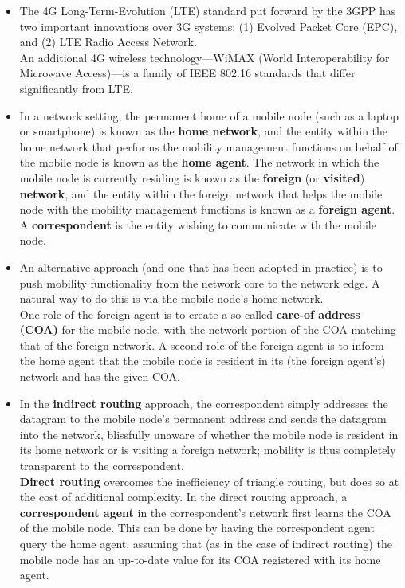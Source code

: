 \begin{itemize}
\item
The 4G Long-Term-Evolution (LTE) standard put forward by the 3GPP has two important innovations over 3G systems: (1) Evolved Packet Core (EPC), and (2) LTE Radio Access Network.\\
An additional 4G wireless technology---WiMAX (World Interoperability for Microwave Access)---is a family of IEEE 802.16 standards that differ significantly from LTE.

\item
In a network setting, the permanent home of a mobile node (such as a laptop or smartphone) is known as the \textbf{home network}, and the entity within the home network that performs the mobility management functions on behalf of the mobile node is known as the \textbf{home agent}. The network in which the mobile node is currently residing is known as the \textbf{foreign} (or \textbf{visited}) \textbf{network}, and the entity within the foreign network that helps the mobile node with the mobility management functions is known as a \textbf{foreign agent}. A \textbf{correspondent} is the entity wishing to communicate with the mobile node.

\item
An alternative approach (and one that has been adopted in practice) is to push mobility functionality from the network core to the network edge. A natural way to do this is via the mobile node's home network.\\
One role of the foreign agent is to create a so-called \textbf{care-of address (COA)} for the mobile node, with the network portion of the COA matching that of the foreign network. A second role of the foreign agent is to inform the home agent that the mobile node is resident in its (the foreign agent's) network and has the given COA.

\item
In the \textbf{indirect routing} approach, the correspondent simply addresses the datagram to the mobile node's permanent address and sends the datagram into the network, blissfully unaware of whether the mobile node is resident in its home network or is visiting a foreign network; mobility is thus completely transparent to the correspondent.\\
\textbf{Direct routing} overcomes the inefficiency of triangle routing, but does so at the cost of additional complexity. In the direct routing approach, a \textbf{correspondent agent} in the correspondent's network first learns the COA of the mobile node. This can be done by having the correspondent agent query the home agent, assuming that (as in the case of indirect routing) the mobile node has an up-to-date value for its COA registered with its home agent.


\end{itemize}
